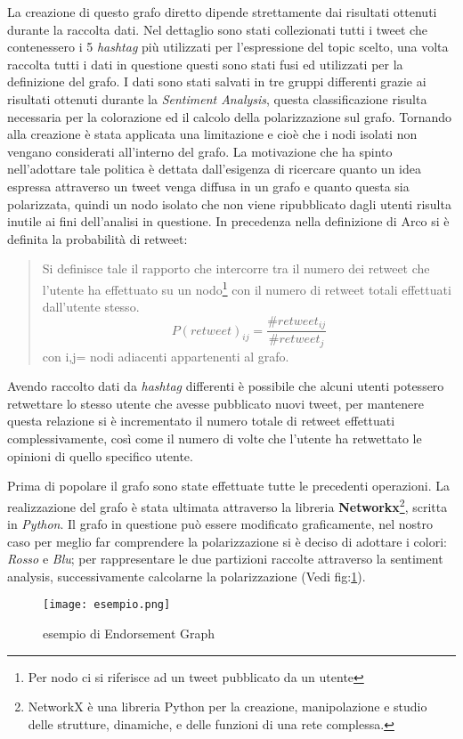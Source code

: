 La creazione di questo grafo diretto dipende strettamente dai risultati ottenuti durante la raccolta dati. Nel dettaglio sono stati collezionati tutti i tweet che contenessero i 5 \textit{hashtag} più utilizzati per l'espressione del topic scelto, una volta raccolta tutti i dati in questione questi sono stati fusi ed utilizzati per la definizione del grafo. I dati sono stati salvati in tre gruppi differenti grazie ai risultati ottenuti durante la \textit{Sentiment Analysis}, questa classificazione risulta necessaria per la colorazione ed il calcolo della polarizzazione sul grafo. Tornando alla creazione è stata applicata una limitazione e cioè che i nodi isolati non vengano considerati all'interno del grafo. La motivazione che ha spinto nell'adottare tale politica è dettata dall'esigenza di ricercare quanto un idea espressa attraverso un tweet venga diffusa in un grafo e quanto questa sia polarizzata, quindi un nodo isolato che non viene ripubblicato dagli utenti risulta inutile ai fini dell'analisi in questione.
In precedenza nella definizione di Arco si è definita la probabilità di retweet:
\begin{quote}
Si definisce tale il rapporto che intercorre tra il numero dei retweet che l'utente ha effettuato su un nodo\footnote{Per nodo ci si riferisce ad un tweet pubblicato da un utente} con il numero di retweet totali effettuati dall'utente stesso.
\begin{equation}
 P(retweet)_{ij} = \dfrac{\#retweet_{ij}}{\#retweet_{j}} 
\end{equation}
 con i,j= nodi adiacenti appartenenti al grafo.
 \end{quote}
 Avendo raccolto dati da \textit{hashtag} differenti è possibile che alcuni utenti potessero retwettare lo stesso utente che avesse pubblicato nuovi tweet, per mantenere questa relazione si è incrementato il numero totale di retweet effettuati complessivamente, così come il numero di volte che l'utente ha retwettato le opinioni di quello specifico utente. 

Prima di popolare il grafo sono state effettuate tutte le precedenti operazioni. La realizzazione del grafo è stata ultimata attraverso la libreria \textbf{Networkx}\footnote{NetworkX è una libreria Python per la creazione, manipolazione e studio delle strutture, dinamiche, e delle funzioni di una rete complessa.}, scritta in \textit{Python}.\cite{NetworkX}
Il grafo in questione può essere modificato graficamente, nel nostro caso per meglio far comprendere la polarizzazione si è deciso di adottare i colori: 	\textit{Rosso} e \textit{Blu}; per rappresentare le due partizioni raccolte attraverso la sentiment analysis, successivamente calcolarne la polarizzazione (Vedi fig:\ref{endorsement}).
\begin{figure}[!h]
    \begin{center}
      \texttt{[image: esempio.png]}
		\caption{esempio di Endorsement Graph}
	\label{endorsement}
    \end{center}
  \end{figure}
\newpage

